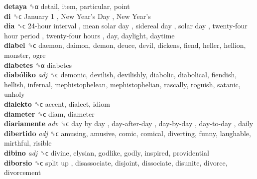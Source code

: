 \textbf{detaya} ␝α  detail, item, particular, point  \\
\textbf{di} ␝ϲ   January 1 ,  New Year’s Day ,  New Year’s   \\
\textbf{dia} ␝ϲ   24-hour interval ,  mean solar day ,  sidereal day ,  solar day ,  twenty-four hour period ,  twenty-four hours , day, daylight, daytime  \\
\textbf{diabel} ␝ϲ  daemon, daimon, demon, deuce, devil, dickens, fiend, heller, hellion, monster, ogre  \\
\textbf{diabetes} ␝α  diabetes  \\
\textbf{diabóliko} \emph{adj}  ␝ϲ  demonic, devilish, devilishly, diabolic, diabolical, fiendish, hellish, infernal, mephistophelean, mephistophelian, rascally, roguish, satanic, unholy  \\
\textbf{dialekto} ␝ϲ  accent, dialect, idiom  \\
\textbf{diameter} ␝ϲ  diam, diameter  \\
\textbf{diariamente} \emph{adv}  ␝ϲ   day by day ,  day-after-day ,  day-by-day ,  day-to-day , daily  \\
\textbf{dibertido} \emph{adj}  ␝ϲ  amusing, amusive, comic, comical, diverting, funny, laughable, mirthful, risible  \\
\textbf{dibino} \emph{adj}  ␝ϲ  divine, elysian, godlike, godly, inspired, providential  \\
\textbf{diborsio} ␝ϲ   split up , disassociate, disjoint, dissociate, disunite, divorce, divorcement  \\
